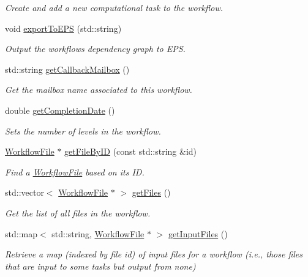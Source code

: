 \begin{DoxyCompactItemize}
\begin{DoxyCompactList}\small\item\em Create and add a new computational task to the workflow. \end{DoxyCompactList}\item 
void \hyperlink{classwrench_1_1_workflow_a73a5f2898f4fdda4cb38933c2c485b28}{export\+To\+E\+PS} (std\+::string)
\begin{DoxyCompactList}\small\item\em Output the workflow\textquotesingle{}s dependency graph to E\+PS. \end{DoxyCompactList}\item 
std\+::string \hyperlink{classwrench_1_1_workflow_a234829c4fa09adab0e5d91324cf118fe}{get\+Callback\+Mailbox} ()
\begin{DoxyCompactList}\small\item\em Get the mailbox name associated to this workflow. \end{DoxyCompactList}\item 
double \hyperlink{classwrench_1_1_workflow_ac3a1291469d2c0035352a99f0f964f3f}{get\+Completion\+Date} ()
\begin{DoxyCompactList}\small\item\em Sets the number of levels in the workflow. \end{DoxyCompactList}\item 
\hyperlink{classwrench_1_1_workflow_file}{Workflow\+File} $\ast$ \hyperlink{classwrench_1_1_workflow_a19b3b6f36f684f8c367f42a818b0a0c2}{get\+File\+By\+ID} (const std\+::string \&id)
\begin{DoxyCompactList}\small\item\em Find a \hyperlink{classwrench_1_1_workflow_file}{Workflow\+File} based on its ID. \end{DoxyCompactList}\item 
std\+::vector$<$ \hyperlink{classwrench_1_1_workflow_file}{Workflow\+File} $\ast$ $>$ \hyperlink{classwrench_1_1_workflow_ab6754d68d09294e56aaffbe75c891369}{get\+Files} ()
\begin{DoxyCompactList}\small\item\em Get the list of all files in the workflow. \end{DoxyCompactList}\item 
std\+::map$<$ std\+::string, \hyperlink{classwrench_1_1_workflow_file}{Workflow\+File} $\ast$ $>$ \hyperlink{classwrench_1_1_workflow_aa0b88cee8316ed20def3010c92a6d69c}{get\+Input\+Files} ()
\begin{DoxyCompactList}\small\item\em Retrieve a map (indexed by file id) of input files for a workflow (i.\+e., those files that are input to some tasks but output from none) \end{DoxyCompactList}\item 

\end{DoxyCompactItemize}
